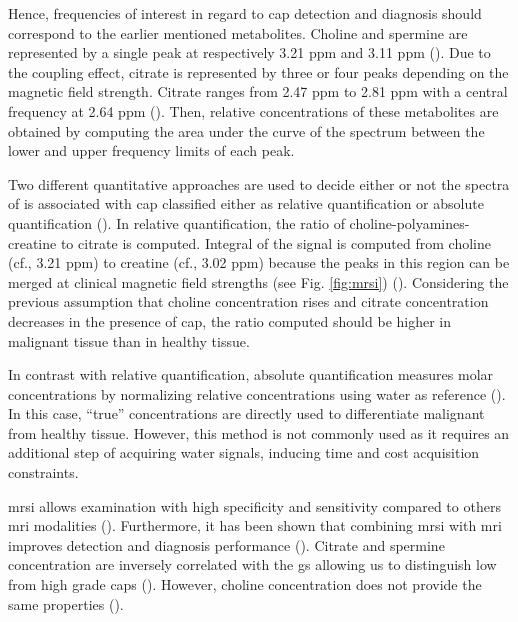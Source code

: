 \begin{enumerate}[leftmargin=*]
Hence, frequencies of interest in regard to \ac{cap} detection and diagnosis should correspond to the earlier mentioned metabolites. Choline and spermine are represented by a single peak at respectively 3.21 ppm and 3.11 ppm (\cite{Verma2010}). Due to the coupling effect, citrate is represented by three or four peaks depending on the magnetic field strength. Citrate ranges from 2.47 ppm to 2.81 ppm with a central frequency at 2.64 ppm (\cite{Verma2010}). Then, relative concentrations of these metabolites are obtained by computing the area under the curve of the spectrum between the lower and upper frequency limits of each peak.

Two different quantitative approaches are used to decide either or not the spectra of  is associated with \ac{cap} classified either as relative quantification or absolute quantification (\cite{Lemaitre2011}). In relative quantification, the ratio of choline-polyamines-creatine to citrate is computed. Integral of the signal is computed from choline (cf., 3.21 ppm) to creatine (cf., 3.02 ppm) because the peaks in this region can be merged at clinical magnetic field strengths (see Fig. \ref{fig:mrsi}) (\cite{Hoeks2011,Graaf2000}). Considering the previous assumption that choline concentration rises and citrate concentration decreases in the presence of \ac{cap}, the ratio computed should be higher in malignant tissue than in healthy tissue. 

In contrast with relative quantification, absolute quantification measures molar concentrations by normalizing relative concentrations using water as reference (\cite{Lemaitre2011}). In this case, ``true'' concentrations are directly used to differentiate malignant from healthy tissue. However, this method is not commonly used as it requires an additional step of acquiring water signals, inducing time and cost acquisition constraints.

\ac{mrsi} allows examination with high specificity and sensitivity compared to others \ac{mri} modalities (\cite{Choi2007}). Furthermore, it has been shown that combining \ac{mrsi} with \ac{mri} improves detection and diagnosis performance (\cite{Scheidler1999a,Kaji1998}). Citrate and spermine concentration are inversely correlated with the \ac{gs} allowing us to distinguish low from high grade \acp{cap} (\cite{Giskeodegard2013}). However, choline concentration does not provide the same properties (\cite{Giskeodegard2013}).


\end{enumerate}
